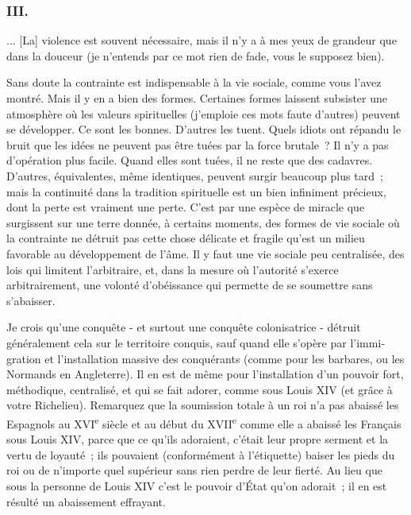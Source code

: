 \documentclass[french,twoside]{book} %
\begin{document}
\subsubsection[III.]{III.}
\noindent ... [La] violence est souvent nécessaire, mais il n'y a à mes yeux de grandeur que dans la douceur (je n'entends par ce mot rien de fade, vous le supposez bien).\par
Sans doute la contrainte est indispensable à la vie sociale, comme vous l'avez montré. Mais il y en a bien des formes. Certaines formes laissent subsister une atmosphère où les valeurs spirituelles (j'emploie ces mots faute d'autres) peuvent se développer. Ce sont les bonnes. D'autres les tuent. Quels idiots ont répandu le bruit que les idées ne peuvent pas être tuées par la force brutale ? Il n'y a pas d'opération plus facile. Quand elles sont tuées, il ne reste que des cadavres. D'autres, équivalentes, même identiques, peuvent surgir beaucoup plus tard ; mais la continuité dans la tradition spirituelle est un bien infiniment précieux, dont la perte est vraiment une perte. C'est par une espèce de miracle que surgissent sur une terre donnée, à certains moments, des for­mes de vie sociale où la contrainte ne détruit pas cette chose délicate et fragile qu'est un milieu favorable au développement de l'âme. Il y faut une vie sociale peu centralisée, des lois qui limitent l'arbitraire, et, dans la mesure où l'autorité s'exerce arbitrairement, une volonté d'obéissance qui permette de se soumettre sans s'abaisser.\par
Je crois qu'une conquête - et surtout une conquête colonisatrice - détruit généralement cela sur le territoire conquis, sauf quand elle s'opère par l'immi­gration et l'installation massive des conquérants (comme pour les barbares, ou les Normands en Angleterre). Il en est de même pour l'installation d'un pouvoir fort, méthodique, centralisé, et qui se fait adorer, comme sous Louis XIV (et grâce à votre Richelieu). Remarquez que la soumission totale à un roi n'a pas abaissé les Espagnols au XVI\textsuperscript{e} siècle et au début du XVII\textsuperscript{e} comme elle a abaissé les Français sous Louis XIV, parce que ce qu'ils adoraient, c'était leur propre serment et la vertu de loyauté ; ils pouvaient (conformément à l'étiquette) baiser les pieds du roi ou de n'importe quel supérieur sans rien perdre de leur fierté. Au lieu que sous la personne de Louis XIV c'est le pouvoir d'État qu'on adorait ; il en est résulté un abaissement effrayant.\par
\par
\end{document}

